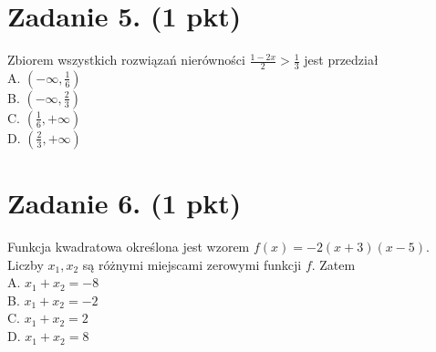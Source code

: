 \documentclass[10pt]{article}
\begin{document}
\section*{Zadanie 5. (1 pkt)}
Zbiorem wszystkich rozwiązań nierówności \(\frac{1-2 x}{2}>\frac{1}{3}\) jest przedział\\
A. \(\left(-\infty, \frac{1}{6}\right)\)\\
B. \(\left(-\infty, \frac{2}{3}\right)\)\\
C. \(\left(\frac{1}{6},+\infty\right)\)\\
D. \(\left(\frac{2}{3},+\infty\right)\)

\section*{Zadanie 6. (1 pkt)}
Funkcja kwadratowa określona jest wzorem \(f(x)=-2(x+3)(x-5)\). Liczby \(x_{1}, x_{2}\) są różnymi miejscami zerowymi funkcji \(f\). Zatem\\
A. \(x_{1}+x_{2}=-8\)\\
B. \(x_{1}+x_{2}=-2\)\\
C. \(x_{1}+x_{2}=2\)\\
D. \(x_{1}+x_{2}=8\)
\end{document}
